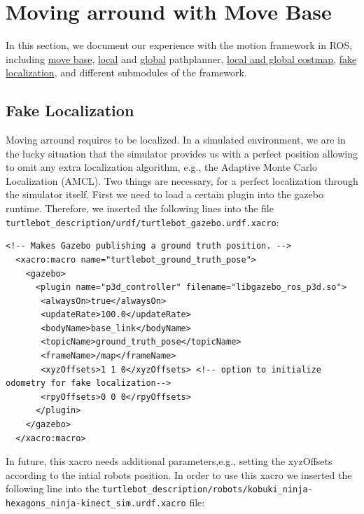 \section{Moving arround with Move Base}
\label{sec:MovingWithMoveBase}

In this section, we document our experience with the motion framework in ROS, including \href{http://wiki.ros.org/move_base}{move base}, \href{http://wiki.ros.org/dwa_local_planner}{local} and \href{http://wiki.ros.org/global_planner}{global} pathplanner, \href{http://wiki.ros.org/costmap_2d}{local and global costmap}, \href{http://wiki.ros.org/fake_localization}{fake localization}, and different submodules of the framework.

\subsection{Fake Localization}
\label{ssec:FakeLocalization}

Moving arround requires to be localized. In a simulated environment, we are in the lucky situation that the simulator provides us with a perfect position allowing to omit any extra localization algorithm, e.g., the Adaptive Monte Carlo Localization (AMCL). Two things are necessary, for a perfect localization through the simulator itself. First we need to load a certain plugin into the gazebo runtime. Therefore, we inserted the following lines into the file \verb$turtlebot_description/urdf/turtlebot_gazebo.urdf.xacro$:

\begin{Verbatim}[fontsize=\scriptsize]
 <!-- Makes Gazebo publishing a ground truth position. -->
  <xacro:macro name="turtlebot_ground_truth_pose">
    <gazebo>
      <plugin name="p3d_controller" filename="libgazebo_ros_p3d.so">
       <alwaysOn>true</alwaysOn>
       <updateRate>100.0</updateRate>
       <bodyName>base_link</bodyName>
       <topicName>ground_truth_pose</topicName>
       <frameName>/map</frameName>
       <xyzOffsets>1 1 0</xyzOffsets> <!-- option to initialize odometry for fake localization-->
       <rpyOffsets>0 0 0</rpyOffsets>
      </plugin>
    </gazebo>
  </xacro:macro>
\end{Verbatim}

In future, this xacro needs additional parameters,e.g., setting the xyzOffsets according to the intial robots position. In order to use this xacro we inserted the following line into the \verb$turtlebot_description/robots/kobuki_ninja-hexagons_ninja-kinect_sim.urdf.xacro$ file:

